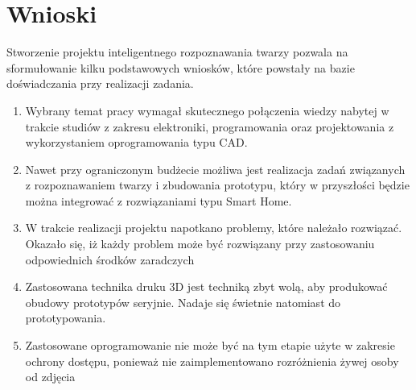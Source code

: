 \documentclass[a4paper,12pt,reqno]{article}
\begin{document}
\newpage
\section{Wnioski} \label{section:wnioski}
Stworzenie projektu inteligentnego rozpoznawania twarzy pozwala na sformułowanie kilku podstawowych wniosków, które powstały na bazie doświadczania przy realizacji zadania.

\begin{enumerate}
\item Wybrany temat pracy wymagał skutecznego połączenia wiedzy nabytej w trakcie studiów z zakresu elektroniki, programowania oraz projektowania z wykorzystaniem oprogramowania typu CAD.
\item Nawet przy ograniczonym budżecie możliwa jest realizacja zadań związanych z rozpoznawaniem twarzy i zbudowania prototypu, który w przyszłości będzie można integrować z rozwiązaniami typu Smart Home.
\item W trakcie realizacji projektu napotkano problemy, które należało rozwiązać. Okazało się, iż każdy problem może być rozwiązany przy zastosowaniu odpowiednich środków zaradczych
\item Zastosowana technika druku 3D jest techniką zbyt wolą, aby produkować obudowy prototypów seryjnie. Nadaje się świetnie natomiast do prototypowania.
\item Zastosowane oprogramowanie nie może być na tym etapie użyte w zakresie ochrony dostępu, ponieważ nie zaimplementowano rozróżnienia żywej osoby od zdjęcia
\end{enumerate}

\newpage



\end{document}

